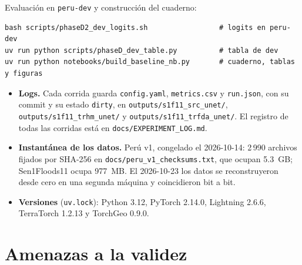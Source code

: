 Evaluación en \texttt{peru-\allowbreak{}dev} y construcción del cuaderno:

{\footnotesize
\begin{verbatim}
bash scripts/phaseD2_dev_logits.sh                 # logits en peru-dev
uv run python scripts/phaseD_dev_table.py          # tabla de dev
uv run python notebooks/build_baseline_nb.py       # cuaderno, tablas y figuras
\end{verbatim}
}

\begin{itemize}
    \item \textbf{Logs.} Cada corrida guarda \texttt{config.yaml}, \texttt{metrics.csv} y
    \texttt{run.json}, con su commit y su estado \texttt{dirty}, en \texttt{outputs/\allowbreak{}s1f11\_\allowbreak{}src\_\allowbreak{}unet/\allowbreak{}},
    \texttt{outputs/\allowbreak{}s1f11\_\allowbreak{}trhm\_\allowbreak{}unet/\allowbreak{}} y \texttt{outputs/\allowbreak{}s1f11\_\allowbreak{}trfda\_\allowbreak{}unet/\allowbreak{}}. El registro de todas
    las corridas está en \texttt{docs/\allowbreak{}EXPERIMENT\_\allowbreak{}LOG.md}.
    \item \textbf{Instantánea de los datos.} Perú v1, congelado el 2026-10-14: 2\,990 archivos
    fijados por SHA-256 en \texttt{docs/\allowbreak{}peru\_\allowbreak{}v1\_\allowbreak{}checksums.txt}, que ocupan 5.3~GB; Sen1Floods11
    ocupa 977~MB. El 2026-10-23 los datos se reconstruyeron desde cero en una segunda máquina y
    coincidieron bit a bit.
    \item \textbf{Versiones} (\texttt{uv.lock}): Python 3.12, PyTorch 2.14.0, Lightning 2.6.6,
    TerraTorch 1.2.13 y TorchGeo 0.9.0.
\end{itemize}

\section{Amenazas a la validez}


